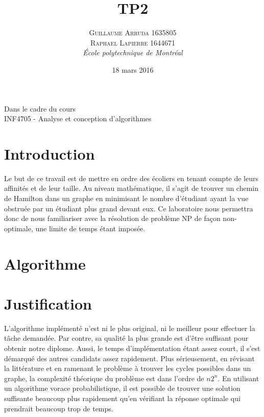 \documentclass[a4paper, 12pt]{article} %
\title{TP2}
\author{\textsc{Guillaume Arruda 1635805\\Raphael Lapierre 1644671} %
\vspace{10pt}
\\{\textit{École polytechnique de Montréal}}} %
\date{18 mars 2016} %
\makeatletter
\renewcommand{\maketitle}{ %
\begin{center} %

\vspace*{25pt} %
{\LARGE\@title} %

\vspace{125pt} %

{\large\@author} %

\vspace{125pt} %
Dans le cadre du cours
\\INF4705 - Analyse et conception d'algorithmes
\vspace{125pt} %
\\\@date %
\vspace{125pt} %

\end{center}
}
\makeatother
\begin{document}
\thispagestyle{empty}
\clearpage\maketitle %
\pagebreak[4]

\setlength{\headheight}{15.0pt}
\pagestyle{fancy}
\fancyhead[C]{}

\section*{Introduction}
Le but de ce travail est de mettre en ordre des écoliers en tenant compte de leurs affinités et de leur taille.
Au niveau mathématique, il s'agit de trouver un chemin de Hamilton dans un graphe en minimisant le nombre d'étudiant
ayant la vue obstruée par un étudiant plus grand devant eux. Ce laboratoire nous permettra donc de nous familiariser avec
la résolution de problème NP de façon non-optimale, une limite de temps étant imposée.
\section*{Algorithme}

\section*{Justification}
L'algorithme implémenté n'est ni le plus original, ni le meilleur pour effectuer la tâche demandée.
Par contre, sa qualité la plus grande est d'être suffisant pour obtenir notre diplome.
Aussi, le temps d'implémentation étant assez court, il s'est démarqué des autres candidats assez rapidement.
Plus sérieusement, en révisant la littérature et en ramenant le problème à trouver les
cycles possibles dans un graphe, la complexité théorique du problème est dans l'ordre de $n2^{n}$. En utilisant
un algorithme vorace probabilistique, il est possible de trouver une solution suffisante beaucoup plus rapidement
qu'en vérifiant la réponse optimale qui prendrait beaucoup trop de temps. 
\end{document}

